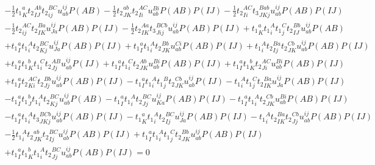 \begin{gather*}
- \frac{1}{2}{t_1}^{a}_{K} {t_2}^{Ab}_{IJ} {t_2}^{BC}_{ij} u^{ij}_{ab} P(AB)
- \frac{1}{2}{t_2}^{ab}_{JK} {t_2}^{AC}_{Ii} u^{Bi}_{ab} P(AB) P(IJ)
- \frac{1}{2}{t_2}^{AC}_{Ii} {t_3}^{Bab}_{JKj} u^{ij}_{ab} P(AB) P(IJ) \\
- \frac{1}{2}{t_2}^{AC}_{ij} {t_2}^{Ba}_{IK} u^{ij}_{Ja} P(AB) P(IJ)
- \frac{1}{2}{t_2}^{Aa}_{IK} {t_3}^{BCb}_{Jij} u^{ij}_{ab} P(AB) P(IJ)
+ {t_1}^{a}_{K} {t_1}^{A}_{i} {t_1}^{C}_{j} {t_2}^{Bb}_{IJ} u^{ij}_{ab} P(AB) \\
+ {t_1}^{a}_{I} {t_1}^{A}_{i} {t_2}^{BC}_{Kj} u^{ij}_{Ja} P(AB) P(IJ)
+ {t_1}^{a}_{I} {t_1}^{A}_{i} {t_2}^{Bb}_{JK} u^{Ci}_{ab} P(AB) P(IJ)
+ {t_1}^{A}_{i} {t_2}^{Ba}_{Ij} {t_2}^{Cb}_{JK} u^{ij}_{ab} P(AB) P(IJ) \\
+ {t_1}^{a}_{I} {t_1}^{b}_{K} {t_1}^{C}_{i} {t_2}^{AB}_{Jj} u^{ij}_{ab} P(IJ)
+ {t_1}^{a}_{I} {t_1}^{C}_{i} {t_2}^{Ab}_{JK} u^{Bi}_{ab} P(AB) P(IJ)
+ {t_1}^{a}_{I} {t_1}^{b}_{K} {t_2}^{AC}_{Ji} u^{Bi}_{ab} P(AB) P(IJ) \\
+ {t_1}^{a}_{I} {t_2}^{AC}_{Ki} {t_2}^{Bb}_{Jj} u^{ij}_{ab} P(AB) P(IJ)
- {t_1}^{a}_{I} {t_1}^{A}_{i} {t_1}^{B}_{j} {t_2}^{Cb}_{JK} u^{ij}_{ab} P(IJ)
- {t_1}^{A}_{i} {t_1}^{C}_{j} {t_2}^{Ba}_{IK} u^{ij}_{Ja} P(AB) P(IJ) \\
- {t_1}^{a}_{I} {t_1}^{b}_{J} {t_1}^{A}_{i} {t_2}^{BC}_{Kj} u^{ij}_{ab} P(AB)
- {t_1}^{a}_{I} {t_1}^{A}_{i} {t_2}^{BC}_{Jj} u^{ij}_{Ka} P(AB) P(IJ)
- {t_1}^{a}_{I} {t_1}^{A}_{i} {t_2}^{Cb}_{JK} u^{Bi}_{ab} P(AB) P(IJ) \\
- {t_1}^{a}_{I} {t_1}^{A}_{i} {t_3}^{BCb}_{JKj} u^{ij}_{ab} P(AB) P(IJ)
- {t_1}^{a}_{K} {t_1}^{A}_{i} {t_2}^{BC}_{Ij} u^{ij}_{Ja} P(AB) P(IJ)
- {t_1}^{A}_{i} {t_2}^{Ba}_{IK} {t_2}^{Cb}_{Jj} u^{ij}_{ab} P(AB) P(IJ) \\
- \frac{1}{2}{t_1}^{A}_{i} {t_2}^{ab}_{JK} {t_2}^{BC}_{Ij} u^{ij}_{ab} P(AB) P(IJ)
+ {t_1}^{a}_{I} {t_1}^{A}_{i} {t_1}^{C}_{j} {t_2}^{Bb}_{JK} u^{ij}_{ab} P(AB) P(IJ) \\
+ {t_1}^{a}_{I} {t_1}^{b}_{K} {t_1}^{A}_{i} {t_2}^{BC}_{Jj} u^{ij}_{ab} P(AB) P(IJ)
= 0
\end{gather*}

